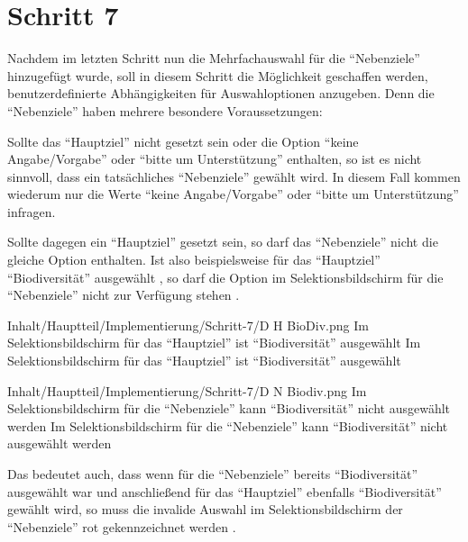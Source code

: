 \chapter{Schritt 7}
\label{chap:Schritt-7}


Nachdem im letzten Schritt nun die Mehrfachauswahl für die \enquote{Nebenziele} hinzugefügt wurde,
soll in diesem Schritt die Möglichkeit geschaffen werden,
benutzerdefinierte Abhängigkeiten für Auswahloptionen anzugeben.
Denn die \enquote{Nebenziele} haben mehrere besondere Voraussetzungen:

Sollte das \enquote{Hauptziel} nicht gesetzt sein oder die Option \enquote{keine Angabe/Vorgabe} oder \enquote{bitte um Unterstützung} enthalten,
so ist es nicht sinnvoll, dass ein tatsächliches \enquote{Nebenziele} gewählt wird.
In diesem Fall kommen wiederum nur die Werte \enquote{keine Angabe/Vorgabe} oder \enquote{bitte um Unterstützung} infragen.

Sollte dagegen ein \enquote{Hauptziel} gesetzt sein, so darf das \enquote{Nebenziele} nicht die gleiche Option enthalten.
Ist also beispielsweise für das \enquote{Hauptziel} \enquote{Biodiversität} ausgewählt \Abb{\ref{fig:Schritt4EingabemaskeDHBioDiv}},
so darf die Option im Selektionsbildschirm für die \enquote{Nebenziele} nicht zur Verfügung stehen \Abb{\ref{fig:Schritt4EingabemaskeDNBiodiv}}.

\begin{alexfigure}{Inhalt/Hauptteil/Implementierung/Schritt-7/D H BioDiv.png}
  {Im Selektionsbildschirm für das \enquote{Hauptziel} ist \enquote{Biodiversität} ausgewählt}
  {Im Selektionsbildschirm für das \enquote{Hauptziel} ist \enquote{Biodiversität} ausgewählt}

  \label{fig:Schritt4EingabemaskeDHBioDiv}

\end{alexfigure}

\begin{alexfigure}{Inhalt/Hauptteil/Implementierung/Schritt-7/D N Biodiv.png}
  {Im Selektionsbildschirm für die \enquote{Nebenziele} kann \enquote{Biodiversität} nicht ausgewählt werden}
  {Im Selektionsbildschirm für die \enquote{Nebenziele} kann \enquote{Biodiversität} nicht ausgewählt werden}

  \label{fig:Schritt4EingabemaskeDNBiodiv}

\end{alexfigure}


Das bedeutet auch,
dass wenn für die \enquote{Nebenziele} bereits \enquote{Biodiversität} ausgewählt war
und anschließend für das \enquote{Hauptziel} ebenfalls \enquote{Biodiversität} gewählt wird,
so muss die invalide Auswahl im Selektionsbildschirm der \enquote{Nebenziele} rot gekennzeichnet werden \Abb{\ref{fig:Schritt4EingabemaskeDNBiodivRot}}. 

